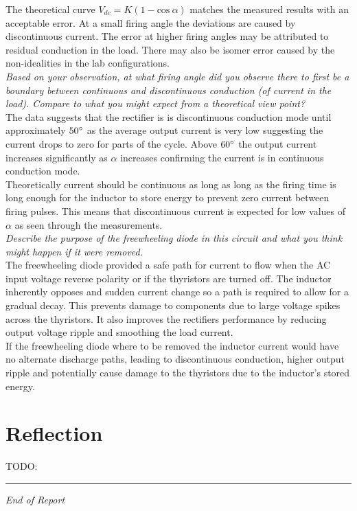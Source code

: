 \documentclass[12pt,a4paper]{article}
\begin{document}
The theoretical curve $V_{dc}=K(1-\mathrm{cos}\:\alpha)$ matches the measured results with an acceptable error. At a small firing angle the deviations are caused by discontinuous current. The error at higher firing angles may be attributed to residual conduction in the load. There may also be isomer error caused by the non-idealities in the lab configurations.\\

\textit{Based on your observation, at what firing angle did you observe there to first be a boundary between continuous and discontinuous conduction (of current in the load). Compare to what you might expect from a theoretical view point?}\\

The data suggests that the rectifier is is discontinuous conduction mode until approximately $50\degree$ as the average output current is very low suggesting the current drops to zero for parts of the cycle. Above $60\degree$ the output current increases significantly as $\alpha$ increases confirming the current is in continuous conduction mode.\\
Theoretically current should be continuous as long as long as the firing time is long enough for the inductor to store energy to prevent zero current between firing pulses. This means that discontinuous current is expected for low values of $\alpha$ as seen through the measurements.\\

\textit{Describe the purpose of the freewheeling diode in this circuit and what you think might happen if it were removed.}\\

The freewheeling diode provided a safe path for current to flow when the AC input voltage reverse polarity or if the thyristors are turned off. The inductor inherently opposes and sudden current change so a path is required to allow for a gradual decay. This prevents damage to components due to large voltage spikes across the thyristors. It also improves the rectifiers performance by reducing output voltage ripple and smoothing the load current.\\
If the freewheeling diode where to be removed the inductor current would have no alternate discharge paths, leading to discontinuous conduction, higher output ripple and potentially cause damage to the thyristors due to the inductor's stored energy.

\section{Reflection}

TODO: 
\newpage



\vfill
\hrule
\begin{center}
\textit{End of Report}
\end{center}
\end{document}
